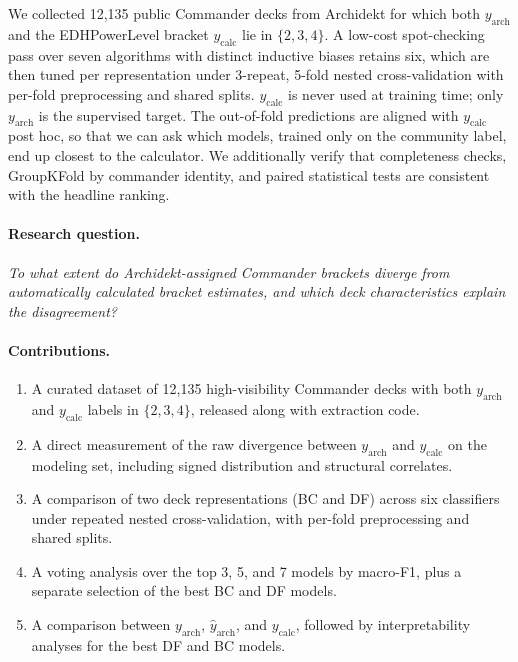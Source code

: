\documentclass{article}
\begin{document}
We collected 12{,}135 public Commander decks from Archidekt for which both \(y_{\text{arch}}\) and the EDHPowerLevel bracket \(y_{\text{calc}}\) lie in \(\{2,3,4\}\). A low-cost spot-checking pass over seven algorithms with distinct inductive biases retains six, which are then tuned per representation under 3-repeat, 5-fold nested cross-validation with per-fold preprocessing and shared splits. \(y_{\text{calc}}\) is never used at training time; only \(y_{\text{arch}}\) is the supervised target. The out-of-fold predictions are aligned with \(y_{\text{calc}}\) post hoc, so that we can ask which models, trained only on the community label, end up closest to the calculator. We additionally verify that completeness checks, GroupKFold by commander identity, and paired statistical tests are consistent with the headline ranking.

\paragraph{Research question.} \textit{To what extent do Archidekt-assigned Commander brackets diverge from automatically calculated bracket estimates, and which deck characteristics explain the disagreement?}

\paragraph{Contributions.}
\begin{enumerate}
  \item A curated dataset of 12{,}135 high-visibility Commander decks with both \(y_{\text{arch}}\) and \(y_{\text{calc}}\) labels in \(\{2,3,4\}\), released along with extraction code.
  \item A direct measurement of the raw divergence between \(y_{\text{arch}}\) and \(y_{\text{calc}}\) on the modeling set, including signed distribution and structural correlates.
  \item A comparison of two deck representations (BC and DF) across six classifiers under repeated nested cross-validation, with per-fold preprocessing and shared splits.
  \item A voting analysis over the top 3, 5, and 7 models by macro-F1, plus a separate selection of the best BC and DF models.
  \item A comparison between \(y_{\text{arch}}\), \(\hat{y}_{\text{arch}}\), and \(y_{\text{calc}}\), followed by interpretability analyses for the best DF and BC models.
\end{enumerate}
\end{document}
